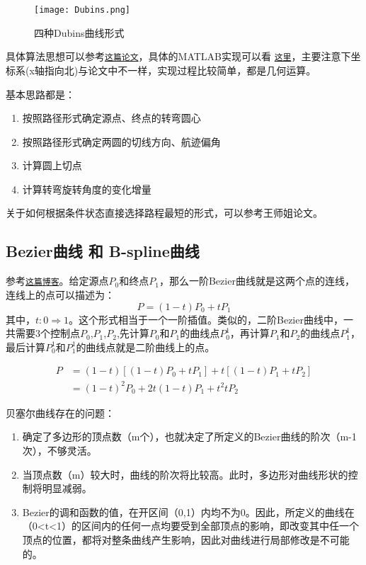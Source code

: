 \begin{figure}[htbp]
	\figskip 
	\centering
	\texttt{[image: Dubins.png]}	  
	\caption{\label{fig: Dubins} 四种Dubins曲线形式}
\end{figure}

具体算法思想可以参考\href{/attachment/Dubins.pdf}{\texttt{这篇论文}}，具体的MATLAB实现可以看
\href{/attachment/dubins.m}{\texttt{这里}}，主要注意下坐标系(x轴指向北)与论文中不一样，实现过程比较简单，都是几何运算。

基本思路都是：
\begin{enumerate}
	\item 按照路径形式确定源点、终点的转弯圆心
	\item 按照路径形式确定两圆的切线方向、航迹偏角
	\item 计算圆上切点
	\item 计算转弯旋转角度的变化增量
\end{enumerate}

关于如何根据条件状态直接选择路程最短的形式，可以参考王师姐论文。

\subsection{Bezier曲线 和 B-spline曲线}

参考\href{https://www.cnblogs.com/hnfxs/p/3148483.html}{\texttt{这篇博客}}。给定源点$P_0$和终点$P_1$，那么一阶Bezier曲线就是这两个点的连线，连线上的点可以描述为：
\begin{equation*}
    P = (1-t)P_0 + tP_1
\end{equation*}
其中，$t: 0 \Rightarrow 1$。这个形式相当于一个一阶插值。类似的，二阶Bezier曲线中，一共需要3个控制点$P_0$,$P_1$,$P_2$,先计算$P_0$和$P_1$的曲线点$P_0^1$，再计算$P_1$和$P_2$的曲线点$P_1^1$，最后计算$P_0^1$和$P_1^1$的曲线点就是二阶曲线上的点。

\begin{align*}
    P &= (1-t)\left[(1-t)P_0 + tP_1\right] + t\left[ (1-t)P_1 + tP_2\right] \\
      &= (1-t)^2 P_0 + 2t(1-t)P_1 + t^2 tP_2
\end{align*}

贝塞尔曲线存在的问题：
\begin{enumerate}
	\item 确定了多边形的顶点数（m个），也就决定了所定义的Bezier曲线的阶次（m-1次），不够灵活。
    \item 当顶点数（m）较大时，曲线的阶次将比较高。此时，多边形对曲线形状的控制将明显减弱。    
    \item Bezier的调和函数的值，在开区间（0,1）内均不为0。因此，所定义的曲线在（0<t<1）的区间内的任何一点均要受到全部顶点的影响，即改变其中任一个顶点的位置，都将对整条曲线产生影响，因此对曲线进行局部修改是不可能的。
\end{enumerate}

